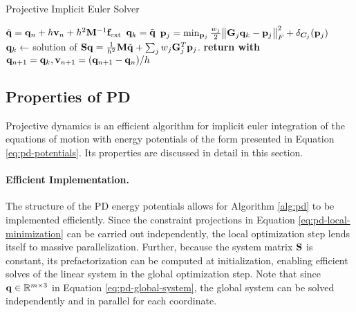\begin{algorithm}[tb]
\caption{Projective Implicit Euler Solver}\label{alg:pd}
\begin{algorithmic}
\State $\tilde{\mathbf{q}} = \mathbf{q}_n + h\mathbf{v}_n + h^2\mathbf{M}^{-1}\mathbf{f}_{\text{ext}}$
\State $\mathbf{q}_k = \tilde{\mathbf{q}}$
\State $\mathbf{p}_j = \min_{\mathbf{p}_j} \frac{w_j}{2}\norm{\mathbf{G}_j\mathbf{q}_k - \mathbf{p}_j}^2_F + \delta_{\bm{C}_j}(\mathbf{p}_j)$
\EndFor
\State $\mathbf{q}_{k} \gets$ solution of $\mathbf{S}\mathbf{q} = \frac{1}{h^2}\mathbf{M}\tilde{\mathbf{q}} + \sum_j w_j \mathbf{G}_j^T \mathbf{p}_j$.
\EndFor
\State \textbf{return with } $\mathbf{q}_{n+1} = \mathbf{q}_k, \mathbf{v}_{n+1} = (\mathbf{q}_{n+1} - \mathbf{q}_n) / h$
\EndProcedure
\end{algorithmic}
\end{algorithm}

\subsection{Properties of PD}\label{ss:pd-properties}
Projective dynamics is an efficient algorithm for implicit euler integration of the equations of motion with energy potentials of the form 
presented in Equation \ref{eq:pd-potentials}. Its properties are discussed in detail in this section.

\paragraph{Efficient Implementation.}
The structure of the PD energy potentials allows for Algorithm \ref{alg:pd} to be implemented efficiently. Since the constraint projections
in Equation \ref{eq:pd-local-minimization} can be carried out independently, the local optimization step lends itself to massive parallelization. 
Further, because the system matrix $\mathbf{S}$ is constant, its prefactorization can be computed at initialization, enabling
efficient solves of the linear system in the global optimization step. Note that since $\mathbf{q} \in \mathbb{R}^{m \times 3}$ in Equation \ref{eq:pd-global-system}, 
the global system can be solved independently and in parallel for each coordinate.

